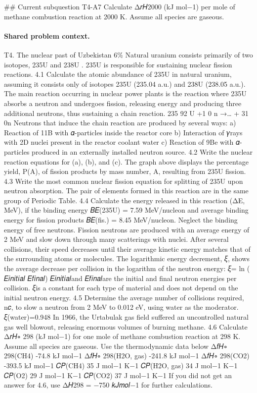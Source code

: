 \#\# Current subquestion T4-A7
Calculate Δ𝑟𝐻2000 (kJ mol−1) per mole of methane combustion reaction at 2000 K. Assume all species are gaseous.

\paragraph{Shared problem context.}
T4. The nuclear past of Uzbekistan 6\% Natural uranium consists primarily of two isotopes, 235U and 238U . 235U is responsible for sustaining nuclear fission reactions. 4.1 Calculate the atomic abundance of 235U in natural uranium, assuming it consists only of isotopes 235U (235.04 a.u.) and 238U (238.05 a.u.). The main reaction occurring in nuclear power plants is the reaction where 235U absorbs a neutron and undergoes fission, releasing energy and producing three additional neutrons, thus sustaining a chain reaction. 235 92 U +1 0 n →… + 31 0n Neutrons that induce the chain reaction are produced by several ways: a) Reaction of 11B with 𝛼-particles inside the reactor core b) Interaction of 𝛾rays with 2D nuclei present in the reactor coolant water c) Reaction of 9Be with 𝛼-particles produced in an externally installed neutron source. 4.2 Write the nuclear reaction equations for (a), (b), and (c). The graph above displays the percentage yield, P(A), of fission products by mass number, A, resulting from 235U fission. 4.3 Write the most common nuclear fission equation for splitting of 235U upon neutron absorption. The pair of elements formed in this reaction are in the same group of Periodic Table. 4.4 Calculate the energy released in this reaction (ΔE, MeV), if the binding energy 𝐵𝐸(235U) = 7.59 MeV/nucleon and average binding energy for fission products 𝐵𝐸(fis.) = 8.45 MeV/nucleon. Neglect the binding energy of free neutrons. Fission neutrons are produced with an average energy of 2 MeV and slow down through many scatterings with nuclei. After several collisions, their speed decreases until their average kinetic energy matches that of the surrounding atoms or molecules. The logarithmic energy decrement, 𝜉, shows the average decrease per collision in the logarithm of the neutron energy: 𝜉= ln ( 𝐸𝑖𝑛𝑖𝑡𝑖𝑎𝑙 𝐸𝑓𝑖𝑛𝑎𝑙) 𝐸𝑖𝑛𝑖𝑡𝑖𝑎𝑙and 𝐸𝑓𝑖𝑛𝑎𝑙are the initial and final neutron energies per collision. 𝜉is a constant for each type of material and does not depend on the initial neutron energy. 4.5 Determine the average number of collisions required, n𝑐, to slow a neutron from 2 MeV to 0.012 eV, using water as the moderator. 𝜉(water)=0.948 In 1966, the Urtabulak gas field suffered an uncontrolled natural gas well blowout, releasing enormous volumes of burning methane. 4.6 Calculate Δ𝑟𝐻∘ 298 (kJ mol−1) for one mole of methane combustion reaction at 298 K. Assume all species are gaseous. Use the thermodynamic data below Δ𝑓𝐻∘ 298(CH4) -74.8 kJ mol−1 Δ𝑓𝐻∘ 298(H2O, gas) -241.8 kJ mol−1 Δ𝑓𝐻∘ 298(CO2) -393.5 kJ mol−1 𝐶𝑃(CH4) 35 J mol−1 K−1 𝐶𝑃(H2O, gas) 34 J mol−1 K−1 𝐶𝑃(O2) 29 J mol−1 K−1 𝐶𝑃(CO2) 37 J mol−1 K−1 If you did not get an answer for 4.6, use Δ𝐻298 = −750 𝑘𝐽𝑚𝑜𝑙−1 for further calculations.

